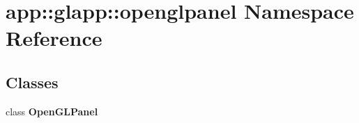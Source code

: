 \section{app::glapp::openglpanel Namespace Reference}
\label{namespaceapp_1_1glapp_1_1openglpanel}


\subsection*{Classes}
\begin{CompactItemize}
\item 
class {\bf OpenGLPanel}
\end{CompactItemize}
